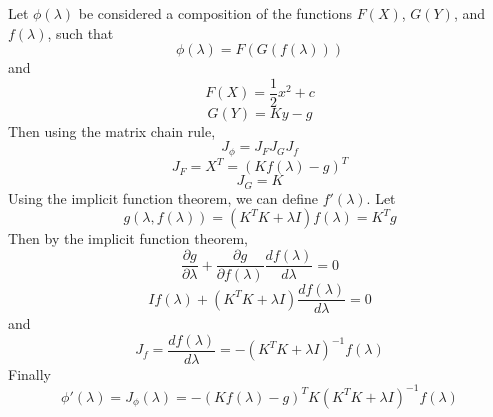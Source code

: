\documentclass{article} %
\begin{document}
Let $\phi(\lambda)$ be considered a composition of the functions $F(X)$, $G(Y)$, and $f(\lambda)$, such that 
 \begin{equation}
\phi(\lambda) = F(G(f(\lambda)))
\end{equation}
and 
\begin{equation}
F(X) = \frac{1}{2}x^2+c
\end{equation}
\begin{equation}
G(Y) = K y - g
\end{equation}
Then using the matrix chain rule,
\begin{equation}
J_{\phi} = J_F J_G J_f
\end{equation}
\begin{equation}
J_F = X^T = (K f(\lambda) - g)^T
\end{equation}
\begin{equation}
J_G = K
\end{equation}
Using the implicit function theorem, we can define $f'(\lambda)$.  Let 
\begin{equation}
g(\lambda, f(\lambda)) = (K^TK+\lambda I)f(\lambda)=K^Tg
\end{equation}
Then by the implicit function theorem,
\begin{equation}
\frac{\partial g}{\partial\lambda} + \frac{\partial g}{\partial f(\lambda)}\frac{d f(\lambda)}{d \lambda} = 0
\end{equation}
\begin{equation}
I f(\lambda) + (K^T K + \lambda I)\frac{d f(\lambda)}{d \lambda} = 0
\end{equation}
and 
\begin{equation}
J_f =\frac{d f(\lambda)}{d \lambda} =  -(K^T K + \lambda I)^{-1} f(\lambda)
\end{equation}
Finally 
\begin{equation}
\phi'(\lambda) = J_{\phi}(\lambda) = -(K f(\lambda) - g)^T K (K^T K + \lambda I)^{-1} f(\lambda)
\end{equation}
\end{document}
